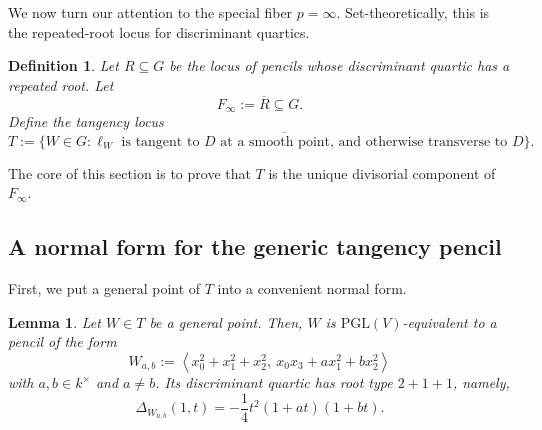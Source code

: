 \documentclass[11pt]{article}
\newtheorem{lemma}[theorem]{Lemma}
\newtheorem{definition}[theorem]{Definition}
\newcommand{\PGL}{\mathrm{PGL}}
\begin{document}
We now turn our attention to the special fiber $p=\infty$. Set-theoretically, this is the repeated-root locus for discriminant quartics.

\begin{definition}
Let $R\subseteq G$ be the locus of pencils whose discriminant quartic has a repeated root. Let
\[
F_\infty:=\overline{R}\subseteq G.
\]
Define the tangency locus
\[
T:=\overline{\{W\in G : \ell_W \text{ is tangent to } D \text{ at a smooth point, and otherwise transverse to } D\}}.
\]
\end{definition}

The core of this section is to prove that $T$ is the unique divisorial component of $F_\infty$.

\subsection{A normal form for the generic tangency pencil}

First, we put a general point of $T$ into a convenient normal form.

\begin{lemma}\label{lem:normal-form}
Let $W\in T$ be a general point. Then, $W$ is $\PGL(V)$-equivalent to a pencil of the form
\[
W_{a,b}:=
\left \langle
x_0^2+x_1^2+x_2^2,\
 x_0x_3 + a x_1^2 + b x_2^2
\right \rangle
\]
with $a,b\in k^\times$ and $a\neq b$. Its discriminant quartic has root type $2+1+1$, namely,
\[
\Delta_{W_{a,b}}(1,t) = -\frac14 t^2(1+at)(1+bt).
\]
\end{lemma}
\end{document}
